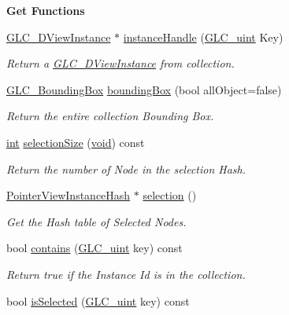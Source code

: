 \begin{Indent}{\bf Get Functions}
\begin{DoxyCompactItemize}
\hyperlink{class_g_l_c__3_d_view_instance}{G\-L\-C\-\_\-D\-View\-Instance} $\ast$ \hyperlink{class_g_l_c__3_d_view_collection_ab65769287fbc984d9ecb0156f6c871e5}{instance\-Handle} (\hyperlink{glc__global_8h_abf950976fabed69026558df8e2da6c6b}{G\-L\-C\-\_\-uint} Key)
\begin{DoxyCompactList}\small\item\em Return a \hyperlink{class_g_l_c__3_d_view_instance}{G\-L\-C\-\_\-D\-View\-Instance} from collection. \end{DoxyCompactList}\item 
\hyperlink{class_g_l_c___bounding_box}{G\-L\-C\-\_\-\-Bounding\-Box} \hyperlink{class_g_l_c__3_d_view_collection_a737dc3e84ebc68bb36a80276eb66d684}{bounding\-Box} (bool all\-Object=false)
\begin{DoxyCompactList}\small\item\em Return the entire collection Bounding Box. \end{DoxyCompactList}\item 
\hyperlink{ioapi_8h_a787fa3cf048117ba7123753c1e74fcd6}{int} \hyperlink{class_g_l_c__3_d_view_collection_a7a7eace06cece221fa23d781ed1a2068}{selection\-Size} (\hyperlink{group___u_a_v_objects_plugin_ga444cf2ff3f0ecbe028adce838d373f5c}{void}) const 
\begin{DoxyCompactList}\small\item\em Return the number of Node in the selection Hash. \end{DoxyCompactList}\item 
\hyperlink{glc__3dviewcollection_8h_a10d00d5caeab00b812ce3dceba3866bb}{Pointer\-View\-Instance\-Hash} $\ast$ \hyperlink{class_g_l_c__3_d_view_collection_aa82a9906065b4ffc9cd960fe2a21af1d}{selection} ()
\begin{DoxyCompactList}\small\item\em Get the Hash table of Selected Nodes. \end{DoxyCompactList}\item 
bool \hyperlink{class_g_l_c__3_d_view_collection_a49b36b3e28deb90ab78c247eb3cc332f}{contains} (\hyperlink{glc__global_8h_abf950976fabed69026558df8e2da6c6b}{G\-L\-C\-\_\-uint} key) const 
\begin{DoxyCompactList}\small\item\em Return true if the Instance Id is in the collection. \end{DoxyCompactList}\item 
bool \hyperlink{class_g_l_c__3_d_view_collection_a60e47e005dae9bf8274f23be4a3d73d0}{is\-Selected} (\hyperlink{glc__global_8h_abf950976fabed69026558df8e2da6c6b}{G\-L\-C\-\_\-uint} key) const 

\end{DoxyCompactItemize}
\end{Indent}
